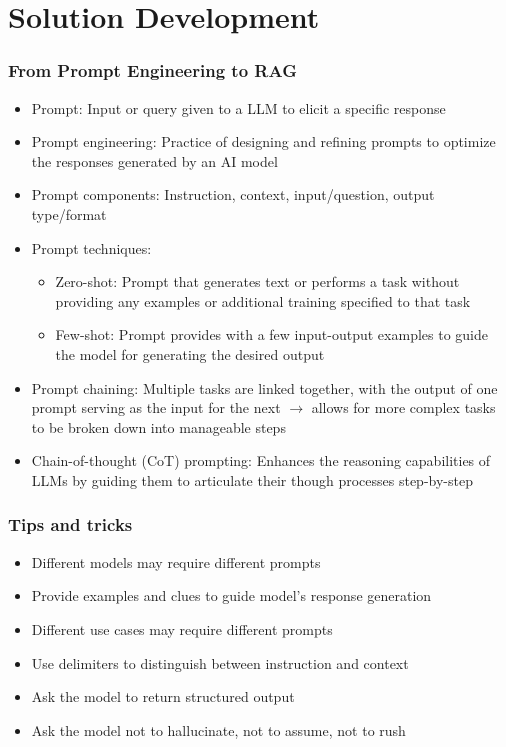 \documentclass[11pt]{scrartcl}
\begin{document}
\newpage
\section{Solution Development}
\subsubsection*{From Prompt Engineering to RAG}
\begin{itemize}
	\item Prompt: Input or query given to a LLM to elicit a specific response
	\item Prompt engineering: Practice of designing and refining prompts to optimize the responses generated by an AI model
	\item Prompt components: Instruction, context, input/question, output type/format
	\item Prompt techniques:
	\begin{itemize}
		\item Zero-shot: Prompt that generates text or performs a task without providing any examples or additional training specified to that task
		\item Few-shot: Prompt provides with a few input-output examples to guide the model for generating the desired output
	\end{itemize}
	\item Prompt chaining: Multiple tasks are linked together, with the output of one prompt serving as the input for the next $\to$ allows for more complex tasks to be broken down into manageable steps
	\item Chain-of-thought (CoT) prompting: Enhances the reasoning capabilities of LLMs by guiding them to articulate their though processes step-by-step
\end{itemize}

\subsubsection*{Tips and tricks}
\begin{itemize}
	\item Different models may require different prompts
	\item Provide examples and clues to guide model's response generation
	\item Different use cases may require different prompts
	\item Use delimiters to distinguish between instruction and context
	\item Ask the model to return structured output
	\item Ask the model not to hallucinate, not to assume, not to rush
\end{itemize}
\end{document}
